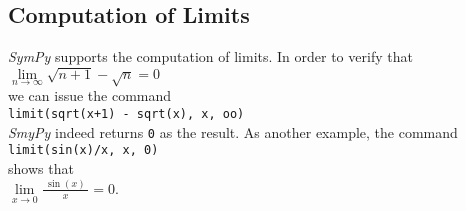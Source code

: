 \documentclass{article}
\newcommand{\bruch}[2]{\displaystyle\frac{\;\displaystyle#1\;}{\;\displaystyle#2\;}}
\begin{document}
\subsection{Computation of Limits}
\textsl{SymPy} supports the computation of limits.  In order to verify that 
\\[0.2cm]
\hspace*{1.3cm}
$\lim\limits_{n \rightarrow \infty} \sqrt{n+1} - \sqrt{n} = 0$
\\[0.2cm]
we can issue the command
\\[0.2cm]
\hspace*{1.3cm}
\texttt{limit(sqrt(x+1) - sqrt(x), x, oo)}
\\[0.2cm]
\textsl{SmyPy} indeed returns \texttt{0} as the result.  As another example, the command
\\[0.2cm]
\hspace*{1.3cm}
\texttt{limit(sin(x)/x, x, 0)}
\\[0.2cm]
shows that
\\[0.2cm]
\hspace*{1.3cm}
$\lim\limits_{x \rightarrow 0} \bruch{\sin(x)}{x} = 0$.
\end{document}
